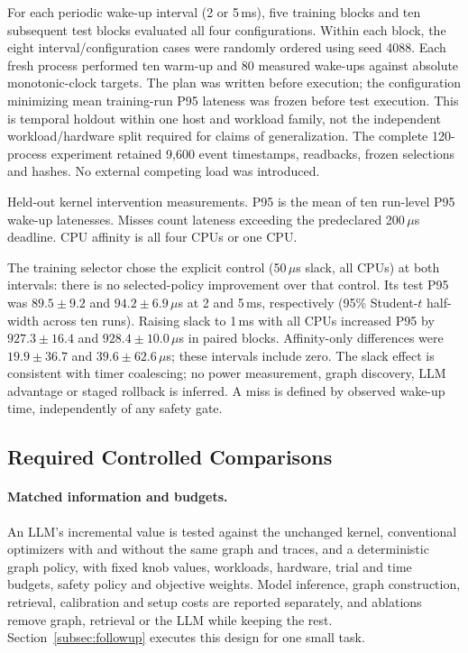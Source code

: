 For each periodic wake-up interval (2 or 5\,ms), five training blocks and ten subsequent test blocks evaluated all four configurations. Within each block, the eight interval/configuration cases were randomly ordered using seed 4088. Each fresh process performed ten warm-up and 80 measured wake-ups against absolute monotonic-clock targets. The plan was written before execution; the configuration minimizing mean training-run P95 lateness was frozen before test execution. This is temporal holdout within one host and workload family, not the independent workload/hardware split required for claims of generalization. The complete 120-process experiment retained 9,600 event timestamps, readbacks, frozen selections and hashes. No external competing load was introduced.

\begin{table}[t]
\centering
\caption{Held-out kernel intervention measurements. P95 is the mean of ten run-level P95 wake-up latenesses. Misses count lateness exceeding the predeclared 200\,$\mu$s deadline. CPU affinity is all four CPUs or one CPU.}
\label{tab:kernel-local}
\small
\begin{adjustbox}{max width=\columnwidth}

\end{adjustbox}
\end{table}

The training selector chose the explicit control (50\,$\mu$s slack, all CPUs) at both intervals: there is no selected-policy improvement over that control. Its test P95 was $89.5\pm9.2$ and $94.2\pm6.9\,\mu$s at 2 and 5\,ms, respectively (95\% Student-$t$ half-width across ten runs). Raising slack to 1\,ms with all CPUs increased P95 by $927.3\pm16.4$ and $928.4\pm10.0\,\mu$s in paired blocks. Affinity-only differences were $19.9\pm36.7$ and $39.6\pm62.6\,\mu$s; these intervals include zero. The slack effect is consistent with timer coalescing; no power measurement, graph discovery, LLM advantage or staged rollback is inferred. A miss is defined by observed wake-up time, independently of any safety gate.

\subsection{Required Controlled Comparisons}
\paragraph{Matched information and budgets.}
An LLM's incremental value is tested against the unchanged kernel, conventional optimizers with and without the same graph and traces, and a deterministic graph policy, with fixed knob values, workloads, hardware, trial and time budgets, safety policy and objective weights. Model inference, graph construction, retrieval, calibration and setup costs are reported separately, and ablations remove graph, retrieval or the LLM while keeping the rest. Section~\ref{subsec:followup} executes this design for one small task.

